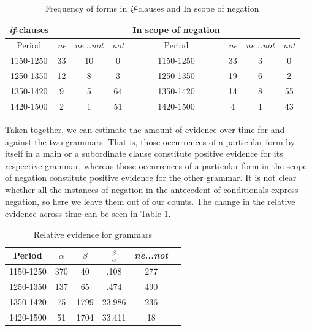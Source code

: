 \begin{table}[ht]
\begin{center}
\begin{tabular}{@{}cccccccc@{}}
\hline
\emph{if}-clauses & & & &In scope of negation &   &   &\\
\hline
Period & \emph{ne} & \emph{ne...not} & \emph{not} & Period & \emph{ne} & \emph{ne...not} & \emph{not}\\
\hline
1150-1250 & 33 & 10 & 0  & 1150-1250 & 33 & 3 & 0  \\
1250-1350 & 12 & 8 & 3  & 1250-1350 & 19 & 6 & 2  \\
1350-1420 & 9 & 5 & 64  & 1350-1420 & 14 & 8 & 55  \\
1420-1500 & 2 & 1 & 51  & 1420-1500 & 4 & 1 & 43  \\
\hline
\end{tabular}
  \caption{Frequency of forms in \emph{if}-clauses and In scope of negation}
\end{center}
\end{table}

Taken together, we can estimate the amount of evidence over time for and against the two grammars. That is, those occurrences of a particular form by itself in a main or a subordinate clause constitute positive evidence for its respective grammar, whereas those occurrences of a particular form in the scope of negation constitute positive evidence for the other grammar. It is not clear whether all the instances of negation in the antecedent of conditionals express negation, so here we leave them out of our counts. The change in the relative evidence across time can be seen in Table \ref{evidence}. 

\begin{table}[ht]
\begin{center}
\begin{tabular}{@{}cccccc@{}}
\hline
Period & $\alpha$ & $\beta$ & $\frac{\beta}{\alpha}$ & \emph{ne...not}\\
\hline
1150-1250 & 370 & 40  & .108 & 277\\
1250-1350 & 137 & 65 & .474 & 490\\
1350-1420 & 75 & 1799 & 23.986 & 236\\
1420-1500 & 51 & 1704 & 33.411 & 18\\
\hline
\end{tabular}
  \caption{Relative evidence for grammars}
\label{evidence}
\end{center}
\end{table}

